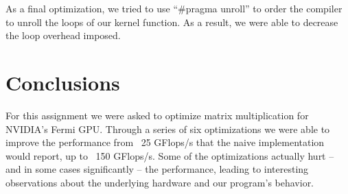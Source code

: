 \documentclass[paper=a4, fontsize=11pt]{scrartcl} %
\numberwithin{equation}{section} %
\numberwithin{figure}{section} %
\numberwithin{table}{section} %
\begin{document}
As a final optimization, we tried to use ``\#pragma unroll'' to order the compiler to unroll the loops of our kernel function. As a result, we were able to decrease the loop overhead imposed.\\



\section{\textbf{Conclusions}}
For this assignment we were asked to optimize matrix multiplication for NVIDIA's Fermi GPU. Through a series of six optimizations we were able to improve the performance from ~25 GFlops/s that the naive implementation would report, up to ~150 GFlops/s. Some of the optimizations actually hurt -- and in some cases significantly -- the performance, leading to interesting observations about the underlying hardware and our program's behavior.
\end{document}
